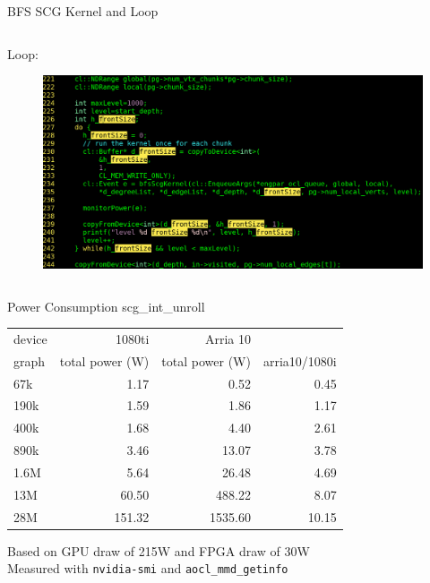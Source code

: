 \documentclass{beamer}
\begin{document}
\begin{frame}{BFS SCG Kernel and Loop}
\begin{columns}
\begin{column}{0.5\textwidth}
\begin{figure}
      \end{figure}  
      Loop:
      \begin{figure}
        \centering
        \includegraphics[width=\textwidth]{figures/kernelLoop.png}
      \end{figure}  
    \end{column}
  \end{columns}
\end{frame}


\begin{frame}{Power Consumption scg\_int\_unroll}
  \begin{table}[]
    \centering
    \begin{tabular}{lrrr}
      device & 1080ti               & Arria 10             &               \\
      graph & total power (W)      & total power (W)      & arria10/1080i \\
      67k   & 1.17                 & 0.52                 & 0.45          \\
      190k  & 1.59                 & 1.86                 & 1.17          \\
      400k  & 1.68                 & 4.40                 & 2.61          \\
      890k  & 3.46                 & 13.07                & 3.78          \\
      1.6M  & 5.64                 & 26.48                & 4.69          \\
      13M   & 60.50                & 488.22               & 8.07          \\
      28M   & 151.32               & 1535.60              & 10.15
    \end{tabular}
  \end{table}
  Based on GPU draw of 215W and FPGA draw of 30W\\
  Measured with \texttt{nvidia-smi} and \texttt{aocl\_mmd\_getinfo}
\end{frame}
\end{document}
